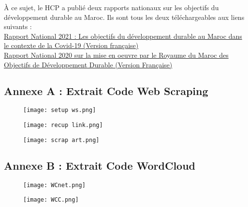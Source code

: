 \documentclass[a4paper,french,12pt]{article}
\begin{document}
\hspace{1cm}

À ce sujet, le HCP a publié deux rapports nationaux sur les objectifs du développement durable au Maroc. Ils sont tous les deux téléchargeables aux liens suivants :\\

\href{https://odd.hcp.ma/file/232819/}{Rapport National 2021 : Les objectifs du développement durable au Maroc dans le contexte de la Covid-19 (Version française)}\\

\href{https://odd.hcp.ma/file/218058/}{Rapport National 2020 sur la mise en oeuvre par le Royaume du Maroc des Objectifs de Développement Durable (Version Française)}

\subsection{Annexe A : Extrait Code Web Scraping}

\vspace{30mm}

\begin{figure}[!h]
    \centering
    \texttt{[image: setup ws.png]}
\end{figure}

\hspace{100cm}

\begin{figure}[!h]
    \centering
    \texttt{[image: recup link.png]}
\end{figure}

\begin{figure}[!h]
    \centering
    \texttt{[image: scrap art.png]}
\end{figure}

\clearpage

\subsection{Annexe B : Extrait Code WordCloud}

\begin{figure}[!h]
    \centering
    \texttt{[image: WCnet.png]}
\end{figure}

\begin{figure}[!h]
    \centering
    \texttt{[image: WCC.png]}
\end{figure}

\clearpage
\end{document}
